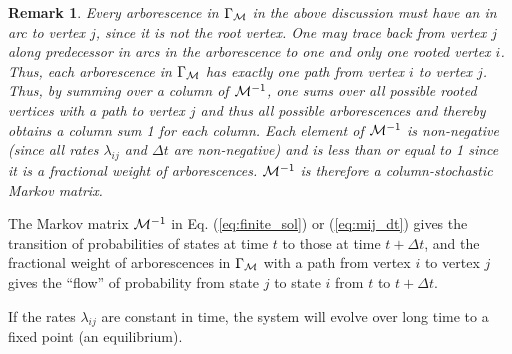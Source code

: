\documentclass{article}
\newtheorem{remark}{Remark}
\begin{document}
\begin{remark}
   Every arborescence in $\Gamma_{\cal M}$ in the above discussion must have an in arc to vertex $j$, since it is not the root vertex.  One may trace back from vertex $j$ along predecessor in arcs in the arborescence to one and only one rooted vertex $i$.  Thus, each arborescence in $\Gamma_{\cal M}$ has exactly one path from vertex $i$ to vertex $j$.  Thus, by summing over a column of ${\cal M}^{-1}$, one sums over all possible rooted vertices with a path to vertex $j$ and thus all possible arborescences and thereby obtains a column sum 1 for each column.  Each element of ${\cal M}^{-1}$ is non-negative (since all rates $\lambda_{ij}$ and $\Delta t$ are non-negative) and is less than or equal to 1 since it is a fractional weight of arborescences.  ${\cal M}^{-1}$ is therefore a column-stochastic Markov matrix.
    \label{remark:markov}
\end{remark}
The Markov matrix ${\cal M}^{-1}$ in Eq. (\ref{eq:finite_sol}) or (\ref{eq:mij_dt}) gives the transition of probabilities of states at time $t$ to those at time $t + \Delta t$, and the fractional weight of arborescences in $\Gamma_{\cal M}$ with a path from vertex $i$ to vertex $j$ gives the ``flow'' of probability from state $j$ to state $i$ from $t$ to $t + \Delta t$.

If the rates $\lambda_{ij}$ are constant in time, the system will evolve over long time to a fixed point (an equilibrium).
\end{document}
